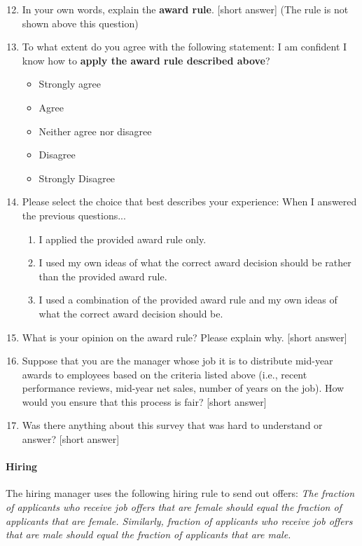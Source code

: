 \documentclass{article}
\begin{document}
\begin{enumerate}
    \setcounter{enumi}{11}
    \item In your own words, explain the \textbf{award rule}. [short answer] (The rule is not shown above this question)
    \item To what extent do you agree with the following statement: I am confident I know how to \textbf{apply the award rule described above}?
    \begin{itemize}
        \item Strongly agree
        \item Agree
        \item Neither agree nor disagree
        \item Disagree
        \item Strongly Disagree
    \end{itemize}
    \item Please select the choice that best describes your experience: When I answered the previous questions...
    \begin{enumerate}
        \item I applied the provided award rule only.
        \item I used my own ideas of what the correct award decision should be rather than the provided award rule.
        \item I used a combination of the provided award rule and my own ideas of what the correct award decision should be.
    \end{enumerate}
    \item What is your opinion on the award rule? Please explain why. [short answer]
    \item Suppose that you are the manager whose job it is to distribute mid-year awards to employees based on the criteria listed above (i.e., recent performance reviews, mid-year net sales, number of years on the job). How would you ensure that this process is fair? [short answer]
    \item Was there anything about this survey that was hard to understand or answer? [short answer]
\end{enumerate}

\paragraph{Hiring}
The hiring manager uses the following hiring rule to send out offers: \emph{The fraction of applicants who receive job offers that are female should equal the fraction of applicants that are female. Similarly, fraction of applicants who receive job offers that are male should equal the fraction of applicants that are male.}
\end{document}
